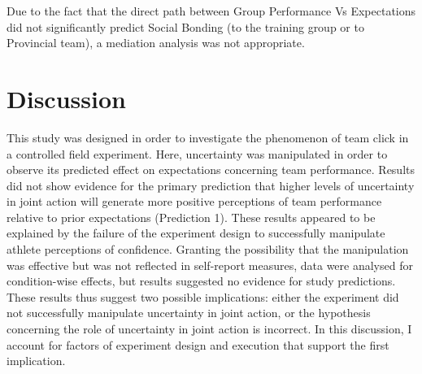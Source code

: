 Due to the fact that the direct path between Group Performance Vs Expectations did not significantly predict Social Bonding (to the training group or to Provincial team), a mediation analysis was not appropriate.




































\clearpage
\section{Discussion\label{sect:discussionTrain}}
This study was designed in order to investigate the phenomenon of team click in a controlled field experiment. Here, uncertainty was manipulated in order to observe its predicted effect on expectations concerning team performance.  Results did not show evidence for the primary prediction that higher levels of uncertainty in joint action will generate more positive perceptions of team performance relative to prior expectations (Prediction 1).  These results appeared to be explained by the failure of the experiment design to successfully manipulate athlete perceptions of confidence.  Granting the possibility that the manipulation was effective but was not reflected in self-report measures, data were analysed for condition-wise effects, but results suggested no evidence for study predictions.  These results thus suggest two possible implications: either the experiment did not successfully manipulate uncertainty in joint action, or the hypothesis concerning the role of uncertainty in joint action is incorrect.  In this discussion, I account for factors of experiment design and execution that support the first implication.


